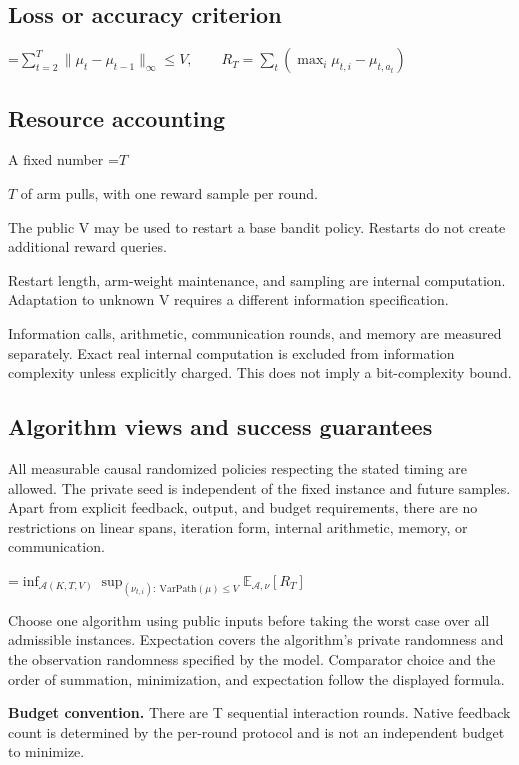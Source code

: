 \documentclass[10pt,a4paper]{article}
\newcommand{\AtlasMath}[1]{\par\begingroup\centering\setbox0=\hbox{$\displaystyle #1$}\ifdim\wd0>1.4\linewidth\typeout{ATLAS WIDE FORMULA: \the\wd0}\fi\ifdim\wd0>\linewidth\resizebox{\linewidth}{!}{\box0}\else\box0\fi\par\endgroup}
\newcommand{\AtlasInlineMath}[1]{\begingroup\setbox0=\hbox{$#1$}\ifdim\wd0>.4\linewidth\endgroup\AtlasMath{#1}\else\endgroup$#1$\fi}
\begin{document}
\subsection{Loss or accuracy criterion}

\AtlasMath{\sum_{t=2}^T\|\mu_t-\mu_{t-1}\|_\infty\le V,\qquad R_T=\sum_t(\max_i\mu_{t,i}-\mu_{t,a_t})}


\subsection{Resource accounting}
A fixed number \AtlasInlineMath{T} of arm pulls, with one reward sample per round.

The public V may be used to restart a base bandit policy. Restarts do not create additional reward queries.

Restart length, arm-weight maintenance, and sampling are internal computation. Adaptation to unknown V requires a different information specification.

Information calls, arithmetic, communication rounds, and memory are measured separately. Exact real internal computation is excluded from information complexity unless explicitly charged. This does not imply a bit-complexity bound.

\subsection{Algorithm views and success guarantees}
All measurable causal randomized policies respecting the stated timing are allowed. The private seed is independent of the fixed instance and future samples. Apart from explicit feedback, output, and budget requirements, there are no restrictions on linear spans, iteration form, internal arithmetic, memory, or communication.


\AtlasMath{\inf_{\mathcal{A}(K,T,V)}\sup_{(\nu_{t,i}):\ \mathrm{VarPath}(\mu)\le V}\mathbb{E}_{\mathcal{A},\nu}[R_T]}


Choose one algorithm using public inputs before taking the worst case over all admissible instances. Expectation covers the algorithm's private randomness and the observation randomness specified by the model. Comparator choice and the order of summation, minimization, and expectation follow the displayed formula.

\textbf{Budget convention.} There are T sequential interaction rounds. Native feedback count is determined by the per-round protocol and is not an independent budget to minimize.
\end{document}
